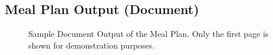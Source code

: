 \documentclass{article}
\begin{document}
\subsection{Meal Plan Output (Document)}
\begin{figure}[!hbt]
  \begin{center}
    \caption{Sample Document Output of the Meal Plan.  Only the first page is shown for demonstration purposes.}
  \end{center}
\end{figure}
\end{document}
